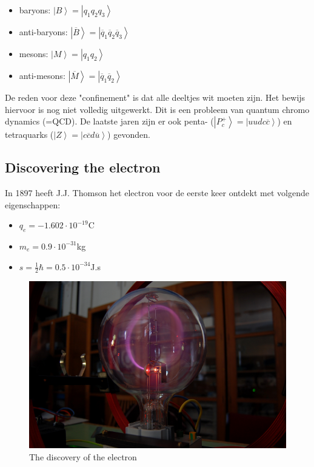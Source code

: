 \documentclass[../main.tex]{subfiles}
\begin{document}
\begin{itemize}
    \item baryons: $\left|B\right>=\left|q_1q_2q_3\right>$
    \item anti-baryons: $\left|\overline B\right>=\left|\overline q_1\overline q_2\overline q_3\right>$
    \item mesons: $\left|M\right>=\left|q_1q_2\right>$
    \item anti-mesons: $\left|\overline M\right>=\left|\overline q_1\overline q_2\right>$
\end{itemize}

De reden voor deze "confinement" is dat alle deeltjes wit moeten zijn. Het bewijs hiervoor is nog niet volledig uitgewerkt. Dit is een probleem van quantum chromo dynamics (=QCD). De laatste jaren zijn er ook penta- ($\left|P_c^+\right>=\left|uudc\overline c\right>$) en tetraquarks ($\left|Z\right>=\left|c\overline c d\overline u\right>$) gevonden.

\subsection{Discovering the electron}%
\label{sub:discovering_the_electron}

In 1897 heeft J.J. Thomson het electron voor de eerste keer ontdekt met volgende eigenschappen:
\begin{itemize}
    \item $q_e = -1.602\cdot 10^{-19}$C
    \item $m_e = 0.9\cdot 10^{-31}$kg
    \item $s = \frac{1}{2}\hbar = 0.5\cdot 10^{-34}$J.s
\end{itemize}

\begin{figure}[h]
    \centering
    \includegraphics[width=0.8\linewidth]{introduction_and_review/elec_disc.png}
    \caption{The discovery of the electron}%
    \label{fig:elec_disc}
\end{figure}
\end{document}

